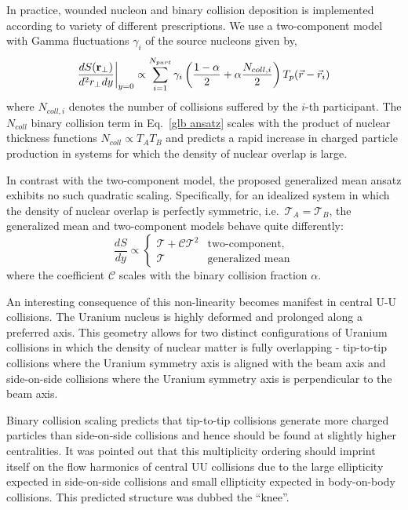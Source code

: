 \documentclass[aps,prl,reprint,amsmath,nofootinbib]{revtex4-1}
\begin{document}
In practice, wounded nucleon and binary collision deposition is implemented according to variety of different
prescriptions. We use a two-component model with Gamma fluctuations $\gamma_i$ of the source nucleons given
by,
\begin{equation}
  \label{glb algorithm}
  \frac{dS({\bf r}_\perp)}{d^2r_\perp dy} \biggr \rvert_{y=0} \propto
  \sum\limits_{i=1}^{N_{part}} \gamma_i \left(\frac{1-\alpha}{2} +
  \alpha \frac{N_{coll,i}}{2} \right ) T_p(\vec{r}-\vec{r}_i)
\end{equation}
where $N_{coll,i}$ denotes the number of collisions suffered by the $i$-th participant. The $N_{coll}$ binary
collision term in Eq.~\eqref{glb ansatz} scales with the product of nuclear thickness functions $N_{coll}
\propto T_A T_B$ and predicts a rapid increase in charged particle production in systems for which the density
of nuclear overlap is large.

In contrast with the two-component model, the proposed generalized mean ansatz exhibits no such quadratic
scaling. Specifically, for an idealized system in which the density of nuclear overlap is perfectly symmetric,
i.e.\ $\mathcal{T}_A = \mathcal{T}_B$, the generalized mean and two-component models behave quite differently:
\begin{equation}
  \label{symmetric scaling}
  \frac{dS}{dy} \propto
  \begin{cases}
    \mathcal{T} + \mathcal{C} \mathcal{T}^2 & \text{two-component,} \\
    \mathcal{T} & \text{generalized mean}
  \end{cases}
\end{equation}
where the coefficient $\mathcal{C}$ scales with the binary collision fraction $\alpha$.

An interesting consequence of this non-linearity becomes manifest in central U-U collisions. The Uranium
nucleus is highly deformed and prolonged along a preferred axis. This geometry allows for two distinct
configurations of Uranium collisions in which the density of nuclear matter is fully overlapping - tip-to-tip
collisions where the Uranium symmetry axis is aligned with the beam axis and side-on-side collisions where
the Uranium symmetry axis is perpendicular to the beam axis.

Binary collision scaling predicts that tip-to-tip collisions generate more charged particles than side-on-side
collisions and hence should be found at slightly higher centralities. It was pointed out that this
multiplicity ordering should imprint itself on the flow harmonics of central UU collisions due to the large
ellipticity expected in side-on-side collisions and small ellipticity expected in body-on-body collisions.
This predicted structure was dubbed the ``knee''.
\end{document}
